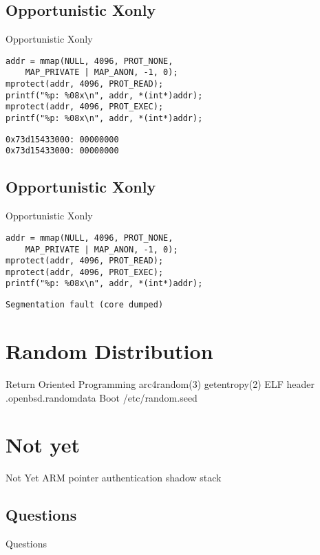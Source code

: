 \documentclass[14pt]{beamer}
\begin{document}
\subsection{Opportunistic Xonly}
\begin{frame}[fragile=singleslide]{Opportunistic Xonly}
\begin{lstlisting}
addr = mmap(NULL, 4096, PROT_NONE,
    MAP_PRIVATE | MAP_ANON, -1, 0);
mprotect(addr, 4096, PROT_READ);
printf("%p: %08x\n", addr, *(int*)addr);
mprotect(addr, 4096, PROT_EXEC);
printf("%p: %08x\n", addr, *(int*)addr);
\end{lstlisting}
\begin{verbatim}
0x73d15433000: 00000000
0x73d15433000: 00000000
\end{verbatim}
\end{frame}

\subsection{Opportunistic Xonly}
\begin{frame}[fragile=singleslide]{Opportunistic Xonly}
\begin{lstlisting}
addr = mmap(NULL, 4096, PROT_NONE,
    MAP_PRIVATE | MAP_ANON, -1, 0);
mprotect(addr, 4096, PROT_READ);
mprotect(addr, 4096, PROT_EXEC);
printf("%p: %08x\n", addr, *(int*)addr);
\end{lstlisting}
\begin{verbatim}
Segmentation fault (core dumped)
\end{verbatim}
\end{frame}

\section{Random Distribution}
\begin{frame}{Return Oriented Programming}
arc4random(3)
getentropy(2)
ELF header .openbsd.randomdata
Boot /etc/random.seed
\end{frame}

\section{Not yet}
\begin{frame}{Not Yet}
ARM pointer authentication
shadow stack
\end{frame}

\subsection{Questions}
\begin{frame}{Questions}
\begin{center}
\end{center}
\end{frame}
\end{document}
